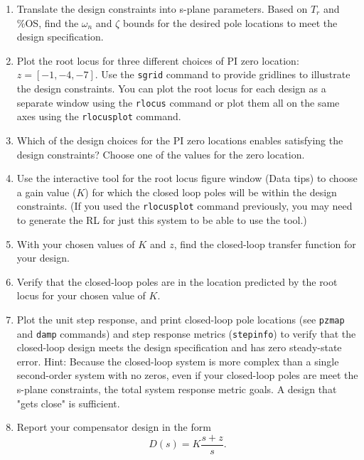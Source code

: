 \documentclass[11pt]{article}
\begin{document}
\begin{enumerate}
\item Translate the design constraints into s-plane parameters.  Based on $T_r$ and \%OS, find the $\omega_n$ and $\zeta$ bounds for the desired pole locations to meet the design specification.
\item Plot the root locus for three different choices of PI zero location: $z = [-1, -4, -7]$.  Use the \texttt{sgrid} command to provide gridlines to illustrate the design constraints.  You can plot the root locus for each design as a separate window using the \texttt{rlocus} command or plot them all on the same axes using the \texttt{rlocusplot} command.
\item Which of the design choices for the PI zero locations enables satisfying the design constraints?   Choose one of the values for the zero location.
\item Use the interactive tool for the root locus figure window (Data tips) to choose a gain value ($K$) for which the closed loop poles will be within the design constraints. (If you used the \texttt{rlocusplot} command previously, you may need to generate the RL for just this system to be able to use the tool.)  
\item With your chosen values of $K$ and $z$, find the closed-loop transfer function for your design.  
\item Verify that the closed-loop poles are in the location predicted by the root locus for your chosen value of $K$.
\item Plot the unit step response, and print closed-loop pole locations (see \texttt{pzmap} and \texttt{damp} commands) and step response metrics (\texttt{stepinfo}) to verify that the closed-loop design meets the design specification and has zero steady-state error.  Hint: Because the closed-loop system is more complex than a single second-order system with no zeros, even if your closed-loop poles are meet the s-plane constraints, the total system response metric goals.  A design that "gets close" is sufficient.
\item Report your compensator design in the form
  \[D(s) = K \frac{s+z}{s}.\]
\end{enumerate}
\end{document}
